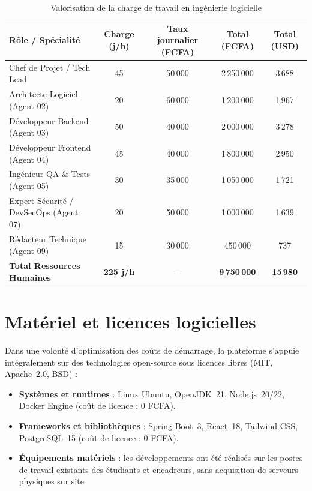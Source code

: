 \begin{table}[h]
\centering
\small
\begin{tabular}{lcccc}
\toprule
\textbf{Rôle / Spécialité} & \textbf{Charge (j/h)} & \textbf{Taux journalier (FCFA)} & \textbf{Total (FCFA)} & \textbf{Total (USD)} \\
\midrule
Chef de Projet / Tech Lead & 45 & 50\,000 & 2\,250\,000 & 3\,688 \\
Architecte Logiciel (Agent 02) & 20 & 60\,000 & 1\,200\,000 & 1\,967 \\
Développeur Backend (Agent 03) & 50 & 40\,000 & 2\,000\,000 & 3\,278 \\
Développeur Frontend (Agent 04) & 45 & 40\,000 & 1\,800\,000 & 2\,950 \\
Ingénieur QA \& Tests (Agent 05) & 30 & 35\,000 & 1\,050\,000 & 1\,721 \\
Expert Sécurité / DevSecOps (Agent 07) & 20 & 50\,000 & 1\,000\,000 & 1\,639 \\
Rédacteur Technique (Agent 09) & 15 & 30\,000 & 450\,000 & 737 \\
\midrule
\textbf{Total Ressources Humaines} & \textbf{225 j/h} & — & \textbf{9\,750\,000} & \textbf{15\,980} \\
\bottomrule
\end{tabular}
\caption{Valorisation de la charge de travail en ingénierie logicielle}
\label{tab:cout-rh}
\end{table}

\section{Matériel et licences logicielles}

Dans une volonté d'optimisation des coûts de démarrage, la plateforme s'appuie intégralement sur des technologies open-source sous licences libres (MIT, Apache~2.0, BSD) :
\begin{itemize}
    \item \textbf{Systèmes et runtimes} : Linux Ubuntu, OpenJDK~21, Node.js~20/22, Docker Engine (coût de licence : 0 FCFA).
    \item \textbf{Frameworks et bibliothèques} : Spring Boot~3, React~18, Tailwind CSS, PostgreSQL~15 (coût de licence : 0 FCFA).
    \item \textbf{Équipements matériels} : les développements ont été réalisés sur les postes de travail existants des étudiants et encadreurs, sans acquisition de serveurs physiques sur site.
\end{itemize}

